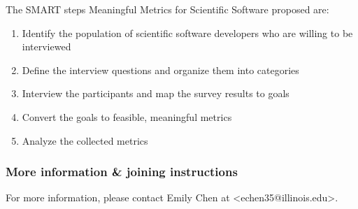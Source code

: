 The SMART steps Meaningful Metrics for Scientific Software proposed are:
\begin{enumerate}
\item Identify the population of scientific software developers who are willing to be interviewed
\item Define the interview questions and organize them into categories
\item Interview the participants and map the survey results to goals
\item Convert the goals to feasible, meaningful metrics
\item Analyze the collected metrics
\end{enumerate}

\subsubsection{More information \& joining instructions}


For more information, please contact Emily Chen at <echen35@illinois.edu>.
